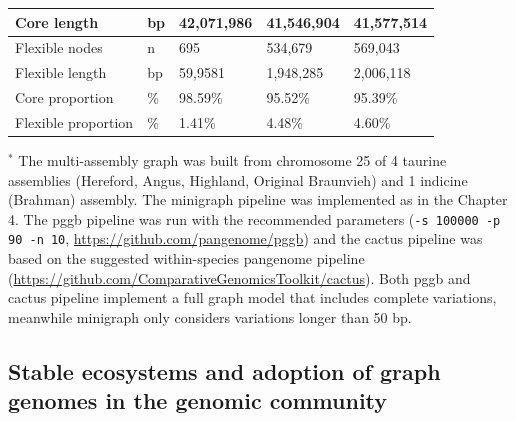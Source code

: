 \documentclass[../main.tex]{subfiles}
\begin{document}
\begin{table}[!htb]
\begin{center}
\begin{tabular}{|l|l|l|l|l|}
   \hline
   Core length                               & bp                                 & 42,071,986                                       & 41,546,904                                  & 41,577,514                                     \\ 
   \hline
   Flexible nodes                            & n                                  & 695                                              & 534,679                                     & 569,043                                        \\ 
   \hline
   Flexible length                           & bp                                 & 59,9581                                          & 1,948,285                                   & 2,006,118                                      \\ 
   \hline
   Core proportion                           & \%                                 & 98.59\%                                          & 95.52\%                                     & 95.39\%                                        \\ 
   \hline
   Flexible proportion                       & \%                                 & 1.41\%                                           & 4.48\%                                      & 4.60\%                                         \\
   \hline
   \end{tabular}
   \label{tab52:mtc}
   \end{center}
   \footnotesize{$^*$ The multi-assembly graph was built from chromosome 25 of 4 taurine assemblies (Hereford, Angus, Highland, Original Braunvieh) and 1 indicine (Brahman) assembly. The minigraph pipeline was implemented as in the Chapter 4. The pggb pipeline was run with the recommended parameters (\texttt{-s 100000 -p 90 -n 10}, \url{https://github.com/pangenome/pggb}) and the cactus pipeline was based on the suggested within-species pangenome pipeline (\url{https://github.com/ComparativeGenomicsToolkit/cactus}). Both pggb and cactus pipeline implement a full graph model that includes complete variations, meanwhile minigraph only considers variations longer than 50 bp. \\
   }
\end{table}

\subsection*{Stable ecosystems and adoption of graph genomes in the genomic community}
\end{document}
